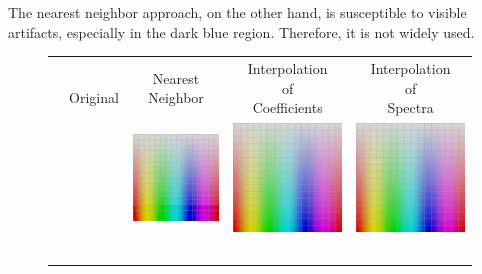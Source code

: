 The nearest neighbor approach, on the other hand, is susceptible to visible artifacts, especially in the dark blue region. Therefore, it is not widely used.

\begin{figure}[t]
	\centering
	{\sffamily
		\setlength\tabcolsep{2.5pt}
		\begin{tabular}{ccccc}
			&\makecell{\\Original\\} &\hspace{0.5em} \makecell{Nearest\\Neighbor}&
			\makecell{Interpolation\\of\\Coefficients}& \makecell{Interpolation\\of\\Spectra}
			\vspace{0.5em} \\ 
			\raisebox{1.5em}[0pt][0pt]{\parbox[c][0pt][c]{0cm}{\hspace{-1.5em}\\[22pt]}\par}
			& 
			& \hspace{0.5em}
			\includegraphics[width=.21\textwidth]{img/uplifting_texture_copyNeighbor.png}
			& 
			\includegraphics[width=.21\textwidth]{img/uplifting_texture_interpCoeff.png}
			& 
			\includegraphics[width=.21\textwidth]{img/uplifting_texture_interpSpectra.png}
			\vspace{0.5em}
			\\ \raisebox{1.5em}[0pt][0pt]{\parbox[c][0pt][c]{0cm}{\hspace{-1.5em}\\[22pt]}\par}

\end{tabular}}
\end{figure}
